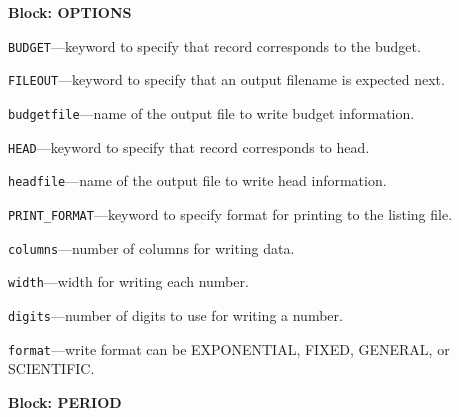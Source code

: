 
\item \textbf{Block: OPTIONS}

\begin{description}
\item \texttt{BUDGET}---keyword to specify that record corresponds to the budget.

\item \texttt{FILEOUT}---keyword to specify that an output filename is expected next.

\item \texttt{budgetfile}---name of the output file to write budget information.

\item \texttt{HEAD}---keyword to specify that record corresponds to head.

\item \texttt{headfile}---name of the output file to write head information.

\item \texttt{PRINT\_FORMAT}---keyword to specify format for printing to the listing file.

\item \texttt{columns}---number of columns for writing data.

\item \texttt{width}---width for writing each number.

\item \texttt{digits}---number of digits to use for writing a number.

\item \texttt{format}---write format can be EXPONENTIAL, FIXED, GENERAL, or SCIENTIFIC.

\end{description}
\item \textbf{Block: PERIOD}


